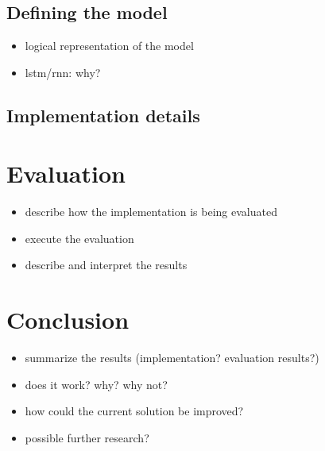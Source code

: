 \documentclass{IEEEtran}
\begin{document}
\subsection{Defining the model}
\label{subsec:modeldefinition}
\begin{itemize}
	\item logical representation of the model
	\item lstm/rnn: why?
\end{itemize}

\subsection{Implementation details}
\label{subsec:impldetails}

\section{Evaluation}
\label{sec:evaluation}
\begin{itemize}
	\item describe how the implementation is being evaluated
	\item execute the evaluation
	\item describe and interpret the results
\end{itemize}

\section{Conclusion}
\label{sec:ausblick}
\begin{itemize}
	\item summarize the results (implementation? evaluation results?) 
	\item does it work? why? why not? 
	\item how could the current solution be improved? 
	\item possible further research? 
\end{itemize}

{}
\end{document}
